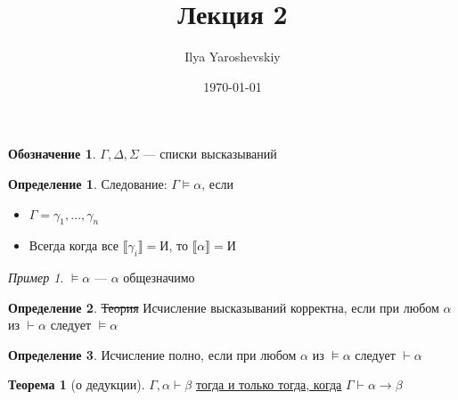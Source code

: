 \documentclass[english]{article}
\author{Ilya Yaroshevskiy}
\date{\today}
\title{Лекция 2}
\newcommand{\llb}{\llbracket}
\newcommand{\rrb}{\rrbracket}
\theoremstyle{plain}
\theoremstyle{remark}
\newtheorem*{examp}{Пример}
\theoremstyle{definition}
\newtheorem{theorem}{Теорема}[section]
\newtheorem*{definition}{Определение}
\newtheorem*{symb}{Обозначение}
\begin{document}
\maketitle
\tableofcontents

\begin{symb}
\(\Gamma, \Delta, \Sigma\) --- списки высказываний
\end{symb}
\begin{definition}
Следование: \(\Gamma \vDash \alpha\), если
\begin{itemize}
\item \(\Gamma = \gamma_1, \dots, \gamma_n\)
\item Всегда когда все \(\llb \gamma_i \rrb = \text{И}\), то \(\llb \alpha \rrb = \text{И}\)
\end{itemize}
\end{definition}
\begin{examp}
\(\vDash \alpha\) --- \(\alpha\) общезначимо
\end{examp}
\begin{definition}
\sout{Теория} Исчисление высказываний корректна, если при любом \(\alpha\) из \(\vdash \alpha\) следует \(\vDash \alpha\)
\end{definition}
\begin{definition}
Исчисление полно, если при любом \(\alpha\) из \(\vDash \alpha\) следует \(\vdash \alpha\)
\end{definition}
\begin{theorem}[о дедукции]
\(\Gamma, \alpha \vdash \beta\) \uline{тогда и только тогда, когда} \(\Gamma \vdash \alpha \to \beta\)
\end{theorem}
\end{document}
